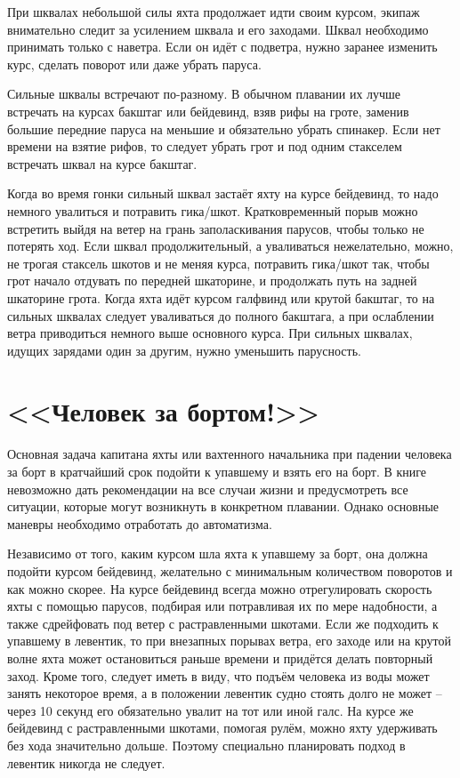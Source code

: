 При шквалах небольшой силы яхта продолжает идти своим курсом, экипаж внимательно следит за усилением шквала и его заходами. Шквал необходимо принимать только с наветра. Если он идёт с подветра, нужно заранее изменить курс, сделать поворот или даже убрать паруса.

Сильные шквалы встречают по-разному. В обычном плавании их лучше встречать на курсах бакштаг или бейдевинд, взяв рифы на гроте, заменив большие передние паруса на меньшие и обязательно убрать спинакер. Если нет времени на взятие рифов, то следует убрать грот и под одним стакселем встречать шквал на курсе бакштаг.

Когда во время гонки сильный шквал застаёт яхту на курсе бейдевинд, то надо немного увалиться и потравить гика\-/шкот. Кратковременный порыв можно встретить выйдя на ветер на грань заполаскивания парусов, чтобы только не потерять ход. Если шквал продолжительный, а уваливаться нежелательно, можно, не трогая стаксель шкотов и не меняя курса, потравить гика\-/шкот так, чтобы грот начало отдувать по передней шкаторине, и продолжать путь на задней шкаторине грота. Когда яхта идёт курсом галфвинд или крутой бакштаг, то на сильных шквалах следует уваливаться до полного бакштага, а при ослаблении ветра приводиться немного выше основного курса. При сильных шквалах, идущих зарядами один за другим, нужно уменьшить парусность.

\section{<<Человек за бортом!>>}

Основная задача капитана яхты или вахтенного начальника при падении человека за борт в кратчайший срок подойти к упавшему и взять его на борт. В книге невозможно дать рекомендации на все случаи жизни и предусмотреть все ситуации, которые могут возникнуть в конкретном плавании. Однако основные маневры необходимо отработать до автоматизма.

Независимо от того, каким курсом шла яхта к упавшему за борт, она должна подойти курсом бейдевинд, желательно с минимальным количеством поворотов и как можно скорее. На курсе бейдевинд всегда можно отрегулировать скорость яхты с помощью парусов, подбирая или потравливая их по мере надобности, а также сдрейфовать под ветер с растравленными шкотами. Если же подходить к упавшему в левентик, то при внезапных порывах ветра, его заходе или на крутой волне яхта может остановиться раньше времени и придётся делать повторный заход. Кроме того, следует иметь в виду, что подъём человека из воды может занять некоторое время, а в положении левентик судно стоять долго не может \--- через 10 секунд его обязательно увалит на тот или иной галс. На курсе же бейдевинд с растравленными шкотами, помогая рулём, можно яхту удерживать без хода значительно дольше. Поэтому специально планировать подход в левентик никогда не следует.

